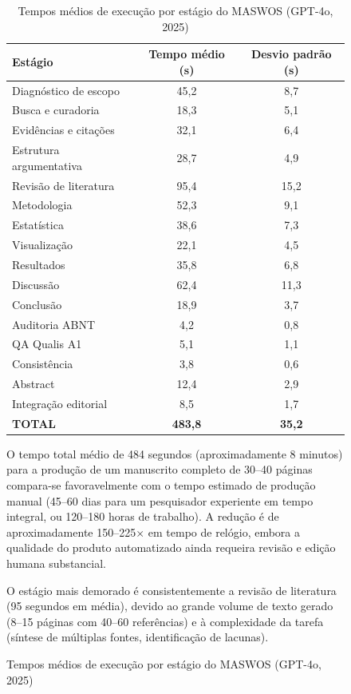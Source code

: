 \begin{figure}
\begin{table}[H]
\centering
\caption{Tempos médios de execução por estágio do MASWOS (GPT-4o, 2025)}
\label{tab:tempos}
\begin{tabular}{l c c}
\toprule
\textbf{Estágio} & \textbf{Tempo médio (s)} & \textbf{Desvio padrão (s)} \\
\midrule
Diagnóstico de escopo    & 45,2 & 8,7 \\
Busca e curadoria        & 18,3 & 5,1 \\
Evidências e citações    & 32,1 & 6,4 \\
Estrutura argumentativa  & 28,7 & 4,9 \\
Revisão de literatura    & 95,4 & 15,2 \\
Metodologia              & 52,3 & 9,1 \\
Estatística              & 38,6 & 7,3 \\
Visualização             & 22,1 & 4,5 \\
Resultados               & 35,8 & 6,8 \\
Discussão                & 62,4 & 11,3 \\
Conclusão                & 18,9 & 3,7 \\
Auditoria ABNT           & 4,2  & 0,8 \\
QA Qualis A1             & 5,1  & 1,1 \\
Consistência             & 3,8  & 0,6 \\
Abstract                 & 12,4 & 2,9 \\
Integração editorial     & 8,5  & 1,7 \\
\midrule
\textbf{TOTAL}           & \textbf{483,8} & \textbf{35,2} \\
\bottomrule
\end{tabular}
\end{table}

O tempo total médio de 484 segundos (aproximadamente 8 minutos)
para a produção de um manuscrito completo de 30--40 páginas
compara-se favoravelmente com o tempo estimado de produção manual
(45--60 dias para um pesquisador experiente em tempo integral, ou
120--180 horas de trabalho). A redução é de aproximadamente
150--225$\times$ em tempo de relógio, embora a qualidade do
produto automatizado ainda requeira revisão e edição humana
substancial.

O estágio mais demorado é consistentemente a revisão de literatura
(95 segundos em média), devido ao grande volume de texto gerado
(8--15 páginas com 40--60 referências) e à complexidade da tarefa
(síntese de múltiplas fontes, identificação de lacunas).


\end{figure}
